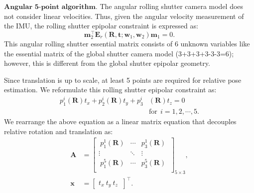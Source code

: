 \documentclass[10pt,twocolumn,letterpaper]{article}
\theoremstyle{definition}
\begin{document}
	
	\vspace{3mm}
	\noindent $\textbf{Angular 5-point algorithm.}$
	The angular rolling shutter camera model does not consider linear velocities.
	Thus, given the angular velocity measurement of the IMU, the rolling shutter epipolar constraint is expressed as:
	\begin{equation}
	\mathbf{m}_{2}^{\top} \mathbf{E}_{r} (\mathbf{R},\mathbf{t}; \mathbf{w}_1,\mathbf{w}_2) \mathbf{m}_{1} = 0 .
	\label{eq:rolling_shutter_epipolar_geometry}
	\end{equation}
	This angular rolling shutter essential matrix consists of 6 unknown variables like the essential matrix of the global shutter camera model (3+3+3+3-3-3=6); however, this is different from the global shutter epipolar geometry.
	
	Since translation is up to scale, at least 5 points are required for relative pose estimation.
	We reformulate this rolling shutter epipolar constraint as:
	\begin{equation}
	\begin{split}
	p_{1}^{i}(\mathbf{R}) t_x + p_{2}^{i}(\mathbf{R}) t_y +  p_{3}^{i}&(\mathbf{R}) t_z  =   0\\
	& \text{for} \ \ i = 1,2,\cdots,5.
	\end{split}
	\end{equation}
	We rearrange the above equation as a linear matrix equation that decouples relative rotation and translation as:
	\begin{equation}
	\begin{split}
	\mathbf{A} & = \begin{bmatrix}
	\ p_{1}^{1}(\mathbf{R}) & \cdots & p_{3}^{1}(\mathbf{R}) \ \\
	\vdots & \ddots & \vdots \ \\
	\ p_{1}^{5}(\mathbf{R}) & \cdots & p_{3}^{5}(\mathbf{R}) \ \\
	\end{bmatrix}_{5 \times 3} ,	
	\\
	\mathbf{x} & = 
	\begin{bmatrix}
	t_x \ 
	t_y \
	t_z \
	\end{bmatrix}^{\top} .
	\end{split}
	\end{equation}
	
\end{document}
